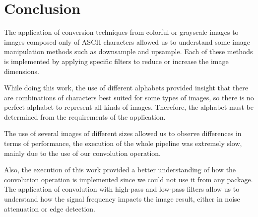 \documentclass[]{IEEEtran}
\begin{document}


\section{Conclusion}
 
The application of conversion techniques from colorful or grayscale images to images composed only of ASCII characters allowed us to understand some image manipulation methods such as downsample and upsample. Each of these methods is implemented by applying specific filters to reduce or increase the image dimensions.

While doing this work, the use of different alphabets provided insight that there are combinations of characters best suited for some types of images, so there is no perfect alphabet to represent all kinds of images. Therefore, the alphabet must be determined from the requirements of the application.

The use of several images of different sizes allowed us to observe differences in terms of performance, the execution of the whole pipeline was extremely slow, mainly due to the use of our convolution operation.
 
Also, the execution of this work provided a better understanding of how the convolution operation is implemented since we could not use it from any package. The application of convolution with high-pass and low-pass filters allow us to understand how the signal frequency impacts the image result, either in noise attenuation or edge detection.

  
\end{document}
